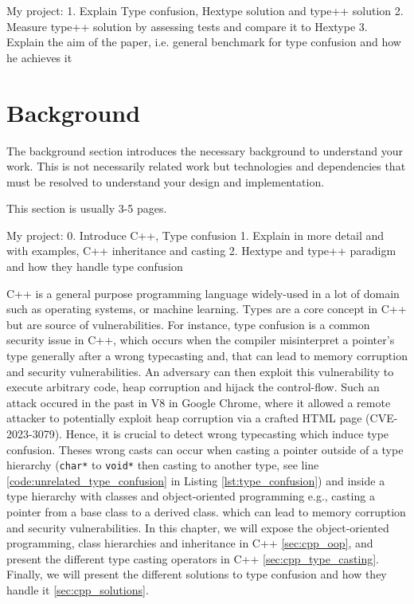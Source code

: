 \documentclass[a4paper,11pt,oneside]{report}
\begin{document}
My project: 
1. Explain Type confusion, Hextype solution and type++ solution
2. Measure type++ solution by assessing tests and compare it to Hextype
3. Explain the aim of the paper, i.e. general benchmark for type confusion and how he achieves it

\chapter{Background}

The background section introduces the necessary background to understand your
work. This is not necessarily related work but technologies and dependencies
that must be resolved to understand your design and implementation.

This section is usually 3-5 pages.

My project:
0. Introduce C++, Type confusion
1. Explain in more detail and with examples, C++ inheritance and casting
2. Hextype and type++ paradigm and how they handle type confusion

C++ is a general purpose programming language widely-used in a lot of domain such as operating systems, 
or machine learning. Types are a core concept in C++ but are source of vulnerabilities. For instance, type confusion 
is a common security issue in C++, which occurs when the compiler misinterpret a pointer's type generally after a wrong typecasting and,
that can lead to memory corruption and security vulnerabilities. An adversary can then exploit this vulnerability to execute arbitrary code, heap corruption and hijack the control-flow.
Such an attack occured in the past in V8 in Google Chrome, where it allowed a remote attacker to potentially exploit
heap corruption via a crafted HTML page (CVE-2023-3079). Hence, it is crucial to detect wrong typecasting which induce type confusion. 
Theses wrong casts can occur when casting a pointer outside of a type hierarchy (\texttt{char*} to \texttt{void*} then casting to another type, see line \ref{code:unrelated_type_confusion} in Listing \autoref{lst:type_confusion}) 
and inside a type hierarchy with classes and object-oriented programming e.g., casting a pointer from a base class to a derived class. 
which can lead to memory corruption and security vulnerabilities. In this chapter, we will
expose the object-oriented programming, class hierarchies and inheritance in C++ \autoref{sec:cpp_oop}, 
and present the different type casting operators in C++ \autoref{sec:cpp_type_casting}. 
Finally, we will present the different solutions to type confusion and how they handle it \autoref{sec:cpp_solutions}.
\end{document}
